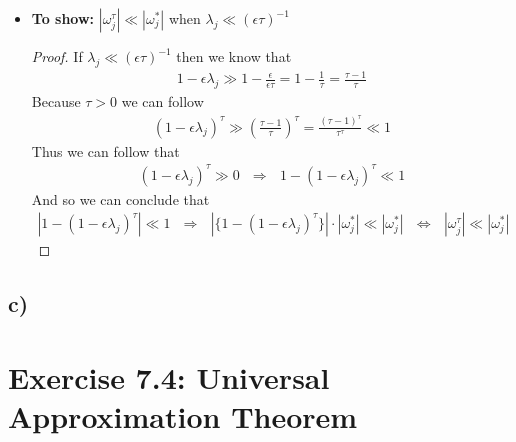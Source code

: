 \documentclass[a4paper]{article}
\begin{document}
\begin{itemize}
            \item \textbf{To show:} $|\omega^{\tau}_j| \ll |\omega^*_j|$ when $\lambda_j \ll (\epsilon\tau)^{-1}$
            \begin{proof}
                If $\lambda_j \ll (\epsilon\tau)^{-1}$ then we know that
                    \begin{align}
                        1-\epsilon\lambda_j \gg 1-\frac{\epsilon}{\epsilon\tau} = 1-\frac{1}{\tau} = \frac{\tau-1}{\tau}
                    \end{align}
                Because $\tau > 0$ we can follow
                    \begin{align}
                        (1-\epsilon\lambda_j)^{\tau} \gg \left(\frac{\tau-1}{\tau}\right)^{\tau} 
                        = \frac{(\tau-1)^{\tau}}{\tau^{\tau}} \ll 1
                    \end{align}
                Thus we can follow that
                    \begin{align}
                        (1-\epsilon\lambda_j)^{\tau} \gg 0
                        \ \ \ \Rightarrow\ \ \  1-(1-\epsilon\lambda_j)^{\tau} \ll 1
                    \end{align}
                And so we can conclude that
                    \begin{align}
                        |1-(1-\epsilon\lambda_j)^{\tau}| \ll 1
                        \ \ \ \Rightarrow\ \ \  |\{1-(1-\epsilon\lambda_j)^{\tau}\}| \cdot |\omega^*_j| \ll |\omega^*_j|
                        \ \ \ \Leftrightarrow\ \ \ |\omega^{\tau}_j| \ll |\omega^*_j|
                    \end{align}
            \end{proof}
        \end{itemize}
    
    \subsection*{c)}



\newpage
\section*{Exercise 7.4: Universal Approximation Theorem}
\end{document}
